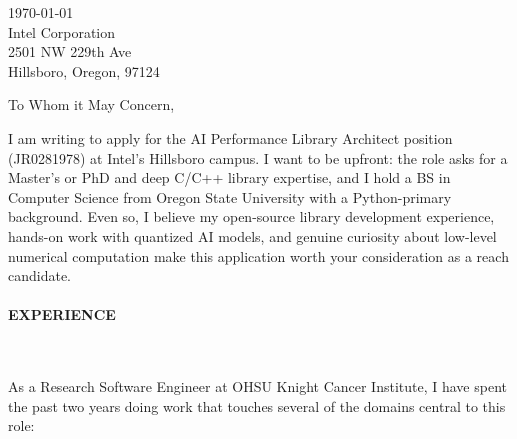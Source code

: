 



\textcolor{my-grey}{\dotfill}
\bigbreak

{\today}\\
Intel Corporation\\
2501 NW 229th Ave\\
Hillsboro, Oregon, 97124

\vspace*{2\baselineskip}

To Whom it May Concern,

\vspace*{\baselineskip}

I am writing to apply for the AI Performance Library Architect position (JR0281978) at Intel's Hillsboro campus. I want to be upfront: the role asks for a Master's or PhD and deep C/C++ library expertise, and I hold a BS in Computer Science from Oregon State University with a Python-primary background. Even so, I believe my open-source library development experience, hands-on work with quantized AI models, and genuine curiosity about low-level numerical computation make this application worth your consideration as a reach candidate.

\paragraph{EXPERIENCE}\

\vspace*{\baselineskip}

As a Research Software Engineer at OHSU Knight Cancer Institute, I have spent the past two years doing work that touches several of the domains central to this role:

